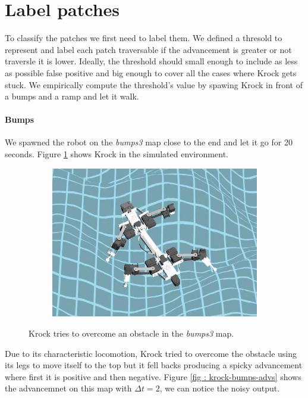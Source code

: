 \documentclass[../document.tex]{subfiles}
\begin{document}
\section{Label patches}
To classify the patches we first need to label them. We defined a thresold to represent and label each patch traversable if the advancement is greater or not traversle it is lower. Ideally, the threshold should small enough to include as less as possible false positive and big enough to cover all the cases where Krock gets stuck. We empirically compute the threshold's value by spawing Krock in front of a bumps and a ramp and let it walk.
    \paragraph{Bumps} We spawned the robot on the \emph{bumps3} map close to the end and let it go for 20 seconds. Figure \ref{fig : krock-bumps-sim} shows Krock in the simulated environment.
    
    \begin{figure}[htbp]
    \centering
        \begin{subfigure}[b]{0.45\textwidth}
        \includegraphics[width=\linewidth]{../img/3/find_tr/krock-bumps.jpg}
        \end{subfigure}
    \caption{Krock tries to overcome an obstacle in the \emph{bumps3} map.}
    \label{fig : krock-bumps-sim}
    \end{figure}
    Due to its characteristic locomotion, Krock tried to overcome the obstacle using its legs to move itself to the top but it fell backs producing a spicky advancement where first it is positive and then negative. Figure \ref{fig : krock-bumps-advs} shows the advancemnet on this map with $\Delta t = 2$, we can notice the noisy output.
    
\end{document}
